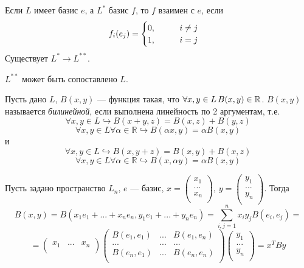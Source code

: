 Если $L$ имеет базис $e$, а $L^*$ базис $f$, то $f$ взаимен с $e$, если
\[
f_i(e_j) = \begin{cases}
    0,\hspace*{1cm} i\neq j\\
    1,\hspace*{1cm} i = j\\
\end{cases}
\]
Существует $L^* \longrightarrow L^{**}$.

\begin{theorem}
    $L^{**}$ может быть сопоставлено $L$.
\end{theorem}

\begin{definition}
    Пусть дано $L$, $B(x, y)$ --- функция такая, что $\forall x, y \in L\thinspace B(x, y) \in \mathbb{R}$. $B(x, y)$ называется \textit{билинейной}, если выполнена линейность по 2 аргументам, т.е.
    \[
    \forall x, y \in L \hookrightarrow B(x + y, z) = B(x, z) + B(y, z)
    \]
    \[
    \forall x, y \in L \forall \alpha \in \mathbb{R} \hookrightarrow B(\alpha x, y) = \alpha B(x, y)
    \]
    и
    \[
    \forall x, y \in L \hookrightarrow B(x, y + z) = B(x, y) + B(x, z)
    \]
    \[
    \forall x, y \in L \forall \alpha \in \mathbb{R} \hookrightarrow B(x, \alpha y) = \alpha B(x, y)
    \]
\end{definition}

Пусть задано пространство $L_n$, $e$ --- базис, $x = \begin{pmatrix}
    x_1\\
    ...\\
    x_n\\
\end{pmatrix}$, $y = \begin{pmatrix}
    y_1\\
    ...\\
    y_n\\
\end{pmatrix}$. Тогда
\[
B(x, y) = B(x_1e_1 + ... + x_ne_n, y_1e_1 + ... + y_ne_n) = \sum_{i, j = 1}^n x_iy_j B(e_i, e_j) = 
\]
\[
=\begin{pmatrix}
    x_1 & ... & x_n\\
\end{pmatrix}\begin{pmatrix}
    B(e_1, e_1) & ... & B(e_1, e_n)\\
    ... & ... & ... \\
    B(e_n, e_1) & ... & B(e_n, e_n)\\
\end{pmatrix}\begin{pmatrix}
    y_1\\
    ...\\
    y_n\\
\end{pmatrix} = x^TBy
\]

